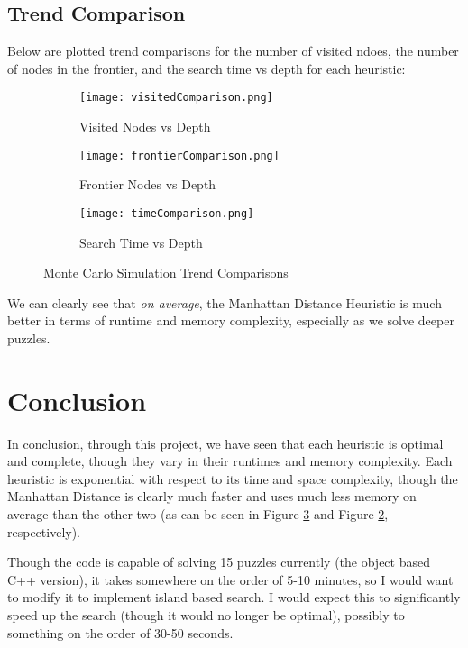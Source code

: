 \documentclass{article}
\begin{document}
\subsection{Trend Comparison}
Below are plotted trend comparisons for the number of visited ndoes, the number of nodes in the frontier, and the search time vs depth for each heuristic:
\begin{figure}[ht]
	\centering
	\begin{subfigure}[b]{0.32\textwidth}
		\centering
		\texttt{[image: visitedComparison.png]}
		\caption{Visited Nodes vs Depth}
		\label{fig:Visited Nodes Comparison}
	\end{subfigure}
	\hfill
	\begin{subfigure}[b]{0.32\textwidth}
		\centering
		\texttt{[image: frontierComparison.png]}
		\caption{Frontier Nodes vs Depth}
		\label{fig:Frontier Comparison}
	\end{subfigure}
	\hfill
	\begin{subfigure}[b]{0.32\textwidth}
		\centering
		\texttt{[image: timeComparison.png]}
		\caption{Search Time vs Depth}
		\label{fig:Search Time Comparison}
	\end{subfigure}
	\caption{Monte Carlo Simulation Trend Comparisons}
	\label{fig:Monte Carlo Trend Comparisons}
\end{figure}
\par We can clearly see that \emph{on average}, the Manhattan Distance Heuristic is much better in terms of runtime and memory complexity, especially as we solve deeper puzzles.
\pagebreak
\section{Conclusion}
In conclusion, through this project, we have seen that each heuristic is optimal and complete, though they vary in their runtimes and memory complexity. Each heuristic is exponential with respect to its time and space complexity, though the Manhattan Distance is clearly much faster and uses much less memory on average than the other two (as can be seen in Figure \ref{fig:Search Time Comparison} and Figure \ref{fig:Frontier Comparison}, respectively).
\par Though the code is capable of solving 15 puzzles currently (the object based C++ version), it takes somewhere on the order of 5-10 minutes, so I would want to modify it to implement island based search.  I would expect this to significantly speed up the search (though it would no longer be optimal), possibly to something on the order of 30-50 seconds.
\end{document}
